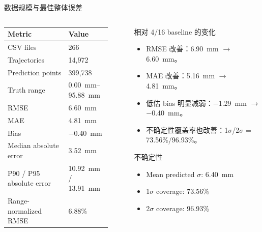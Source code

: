\documentclass[aspectratio=169,11pt]{beamer}
\newcommand{\goodtext}[1]{\textcolor{green!45!black}{#1}}
\newcommand{\notetext}[1]{\textcolor{blue!65!black}{#1}}
\begin{document}
\begin{frame}{数据规模与最佳整体误差}
\small
\begin{columns}[T,onlytextwidth]
\begin{column}{0.48\linewidth}
\begin{tabular}{L{0.55\linewidth}R{0.32\linewidth}}
\toprule
Metric & Value \\
\midrule
CSV files & 266 \\
Trajectories & 14,972 \\
Prediction points & 399,738 \\
Truth range & \SIrange{0.00}{95.88}{mm} \\
\midrule
RMSE & \SI{6.60}{mm} \\
MAE & \SI{4.81}{mm} \\
Bias & \SI{-0.40}{mm} \\
Median absolute error & \SI{3.52}{mm} \\
P90 / P95 absolute error & \SI{10.92}{mm} / \SI{13.91}{mm} \\
Range-normalized RMSE & 6.88\% \\
\bottomrule
\end{tabular}
\end{column}

\begin{column}{0.48\linewidth}
\begin{block}{相对 4/16 baseline 的变化}
\footnotesize
\begin{itemize}
  \item \goodtext{RMSE 改善}：\SI{6.90}{mm} \(\rightarrow\) \SI{6.60}{mm}。
  \item \goodtext{MAE 改善}：\SI{5.16}{mm} \(\rightarrow\) \SI{4.81}{mm}。
  \item \goodtext{低估 bias 明显减弱}：\SI{-1.29}{mm} \(\rightarrow\) \SI{-0.40}{mm}。
  \item \notetext{不确定性覆盖率也改善}：1\(\sigma\)/2\(\sigma\) = 73.56\%/96.93\%。
\end{itemize}
\end{block}

\begin{block}{不确定性}
\footnotesize
\begin{itemize}
  \item Mean predicted \(\sigma\): \SI{6.40}{mm}
  \item 1\(\sigma\) coverage: 73.56\%
  \item 2\(\sigma\) coverage: 96.93\%
\end{itemize}
\end{block}
\end{column}
\end{columns}
\end{frame}
\end{document}
